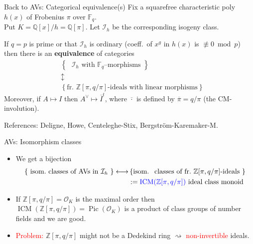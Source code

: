 \documentclass[usenames,dvipsnames,handout]{beamer}
\def\Q{\mathbb{Q}}
\def\Z{\mathbb{Z}}
\def\F{\mathbb{F}}
\DeclareMathOperator{\ICM}{ICM}
\DeclareMathOperator{\Pic}{Pic}
\newcommand{\cO}{{\mathcal O}}
\newcommand{\set}[1]{\left\lbrace#1\right\rbrace }
\newcommand{\red}[1]{\textcolor{red}{#1}}
\newcommand{\blue}[1]{\textcolor{blue}{#1}}
\begin{document}
\begin{frame}{ Back to AVs: Categorical equivalence(s) }
    \pause
    Fix a squarefree characteristic poly $h(x)$ of Frobenius $\pi$ over $\F_q$.\\
    Put $K=\Q[x]/h=\Q[\pi]$.
    Let $\mathcal{I}_h$ be the corresponding isogeny class.
    \pause 
    \begin{theorem}
        If $q=p$ is prime or that $\mathcal{I}_h$ is ordinary (coeff.~of $x^g$ in $h(x)$ is $\not\equiv 0\bmod p$)
        \pause then there is an {\bf equivalence} of categories
        \[
        \begin{array}{cc}
        & \set{ \text{ $\mathcal{I}_h$ with $\F_q$--morphisms } }  \\
        & \updownarrow \\ 
        & \set{ \text{fr.~$\Z[\pi,q/\pi]$-ideals with linear morphisms} }
        \end{array} 
        \]  
        \pause Moreover, if $A\mapsto I$ then $A^\vee \mapsto \overline{I}^t$, where $\overline{\cdot}$ is defined by $\overline{\pi}=q/\pi$ (the CM-involution).
    \end{theorem}
    \pause References: Deligne, Howe, Centeleghe-Stix, Bergstr\"om-Karemaker-M.
\end{frame}

\begin{frame}{ AVs: Isomorphism classes }
    \begin{itemize}
        \item
        We get a bijection
        \begin{align*}
            \set{ \text{ isom.~classes of AVs in $\mathcal{I}_h$ } } \longleftrightarrow & \set{ \text{isom.~ classes of fr.~$\Z[\pi,q/\pi]$-ideals } }\\
            & :=\blue{\ICM(\Z[\pi,q/\pi])} \text{ ideal class monoid}
        \end{align*}
        \item
        If $\Z[\pi,q/\pi] = \cO_K$ is the maximal order then $\ICM(\Z[\pi,q/\pi]) = \Pic(\cO_K)$ is a product of class groups of number fields and we are good.
        \item
        \red{Problem:} $\Z[\pi,q/\pi]$ might not be a Dedekind ring $\rightsquigarrow $ \red{non-invertible} ideals.
    \end{itemize}
\end{frame}
\end{document}
